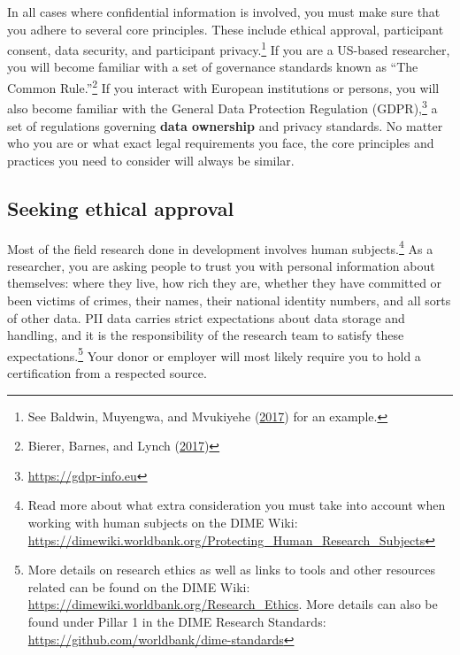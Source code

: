 \documentclass[
]{book}
\begin{document}
In all cases where confidential information is involved,
you must make sure that you adhere to several core principles.
These include ethical approval, participant consent,
data security, and participant privacy.\footnote{See Baldwin, Muyengwa, and Mvukiyehe (\protect\hyperlink{ref-baldwin2017reforming}{2017}) for an example.}
If you are a US-based researcher, you will become familiar
with a set of governance standards known as ``The Common Rule.''\footnote{Bierer, Barnes, and Lynch (\protect\hyperlink{ref-bierer2017revised}{2017})}
If you interact with European institutions or persons,
you will also become familiar with the General Data Protection Regulation (GDPR),\footnote{\url{https://gdpr-info.eu}}
a set of regulations governing \textbf{data ownership} and privacy standards.
No matter who you are or what exact legal requirements you face,
the core principles and practices you need to consider will always be similar.

\hypertarget{seeking-ethical-approval}{%
\subsection*{Seeking ethical approval}\label{seeking-ethical-approval}}

Most of the field research done in development involves human subjects.\footnote{Read more about what extra consideration
  you must take into account when
  working with human subjects on the DIME Wiki:
  \url{https://dimewiki.worldbank.org/Protecting_Human_Research_Subjects}}
As a researcher, you are asking people to trust you with personal information about themselves:
where they live, how rich they are, whether they have committed or been victims of crimes,
their names, their national identity numbers, and all sorts of other data.
PII data carries strict expectations about data storage and handling,
and it is the responsibility of the research team to satisfy these expectations.\footnote{More details on research ethics as well as links to tools and
  other resources related can be found on the DIME Wiki:
  \url{https://dimewiki.worldbank.org/Research_Ethics}.
  More details can also be found under Pillar 1 in the DIME Research Standards:
  \url{https://github.com/worldbank/dime-standards}}
Your donor or employer will most likely require you to hold a certification from a respected source.
\end{document}
